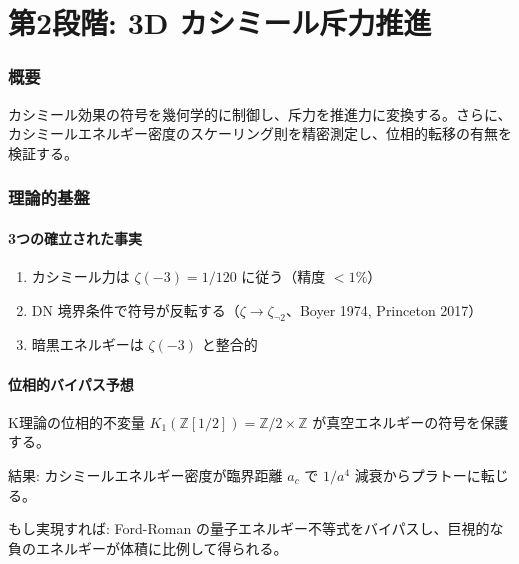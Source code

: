 \documentclass[11pt,a4paper]{article}
\begin{document}
\part{第2段階: 3D カシミール斥力推進}

\section{概要}

\begin{planbox}[第2段階の目標]
カシミール効果の符号を幾何学的に制御し、斥力を推進力に変換する。さらに、カシミールエネルギー密度のスケーリング則を精密測定し、位相的転移の有無を検証する。
\end{planbox}

\section{理論的基盤}

\subsection{3つの確立された事実}

\begin{resultbox}
\begin{enumerate}
\item カシミール力は $\zeta(-3) = 1/120$ に従う（精度 $<1\%$）
\item DN 境界条件で符号が反転する（$\zeta \to \zeta_{\neg 2}$、Boyer 1974, Princeton 2017）
\item 暗黒エネルギーは $\zeta(-3)$ と整合的
\end{enumerate}
\end{resultbox}

\subsection{位相的バイパス予想}

\begin{resultbox}[我々の予測]
K理論の位相的不変量 $K_1(\mathbb{Z}[1/2]) = \mathbb{Z}/2 \times \mathbb{Z}$ が真空エネルギーの符号を保護する。

結果: カシミールエネルギー密度が臨界距離 $a_c$ で $1/a^4$ 減衰からプラトーに転じる。

もし実現すれば: Ford-Roman の量子エネルギー不等式をバイパスし、巨視的な負のエネルギーが体積に比例して得られる。
\end{resultbox}
\end{document}
